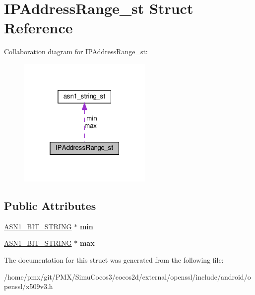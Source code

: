 \hypertarget{structIPAddressRange__st}{}\section{I\+P\+Address\+Range\+\_\+st Struct Reference}
\label{structIPAddressRange__st}


Collaboration diagram for I\+P\+Address\+Range\+\_\+st\+:
\nopagebreak
\begin{figure}[H]
\begin{center}
\leavevmode
\includegraphics[width=184pt]{structIPAddressRange__st__coll__graph}
\end{center}
\end{figure}
\subsection*{Public Attributes}
\begin{DoxyCompactItemize}
\item 
\mbox{\label{structIPAddressRange__st_aca11e64d874d2499deba556da46e12c2}} 
\hyperlink{structasn1__string__st}{A\+S\+N1\+\_\+\+B\+I\+T\+\_\+\+S\+T\+R\+I\+NG} $\ast$ {\bfseries min}
\item 
\mbox{\label{structIPAddressRange__st_a501c4fffd9d31b1990d81895c803bc6a}} 
\hyperlink{structasn1__string__st}{A\+S\+N1\+\_\+\+B\+I\+T\+\_\+\+S\+T\+R\+I\+NG} $\ast$ {\bfseries max}
\end{DoxyCompactItemize}


The documentation for this struct was generated from the following file\+:\begin{DoxyCompactItemize}
\item 
/home/pmx/git/\+P\+M\+X/\+Simu\+Cocos3/cocos2d/external/openssl/include/android/openssl/x509v3.\+h\end{DoxyCompactItemize}
